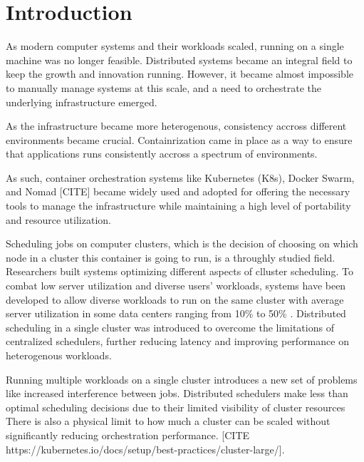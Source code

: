 
\chapter{Introduction}

As modern computer systems and their workloads scaled, running on a single
machine was no longer feasible. Distributed systems became an integral field to
keep the growth and innovation running. However, it became almost impossible to
manually manage systems at this scale, and a need to orchestrate the underlying
infrastructure emerged. 

As the infrastructure became more heterogenous, consistency accross different
environments became crucial. Containrization came in place as a way to ensure
that applications runs consistently accross a spectrum of environments. 

As such, container orchestration systems like Kubernetes (K8s), Docker Swarm,
and Nomad [CITE] became widely used and adopted for offering the necessary
tools to manage the infrastructure while maintaining a high level of portability
and resource utilization. 

Scheduling jobs on computer clusters, which is the decision of choosing on
which node in a cluster this container is going to run, is a throughly studied
field. Researchers built systems optimizing different aspects of clluster
scheduling. To combat low server utilization and diverse users' workloads,
systems have been developed to allow diverse workloads to run on the same
cluster \cite{bhattacharya_hierarchical_2013, hindman_mesos_nodate} with
average server utilization in some data centers ranging from 10\% to 50\%
\cite{lo_heracles_2015}. Distributed scheduling in a single cluster was
introduced to overcome the limitations of centralized schedulers, further
reducing latency and improving performance on heterogenous workloads. 

Running multiple workloads on a single cluster introduces a new set of problems
like increased interference between jobs. 
Distributed schedulers make less than optimal scheduling decisions due to their
limited visibility of cluster resources
There is also a physical limit to how much a cluster can be scaled without
significantly reducing orchestration performance. [CITE
https://kubernetes.io/docs/setup/best-practices/cluster-large/].

